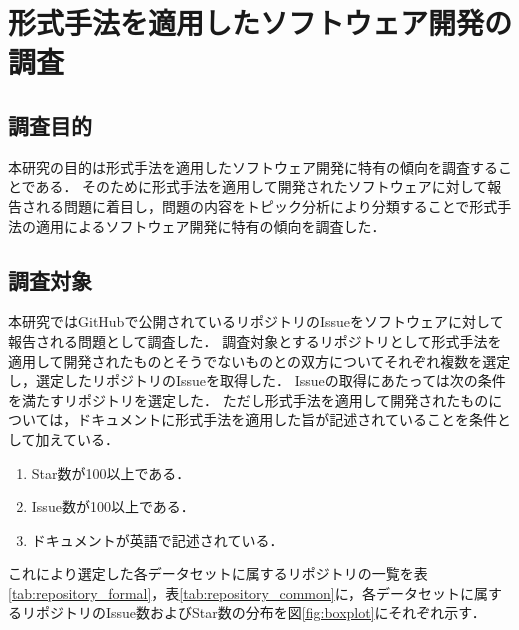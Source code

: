 \documentclass[main]{subfiles}
\begin{document}
\chapter{形式手法を適用したソフトウェア開発の調査}

\section{調査目的}

本研究の目的は形式手法を適用したソフトウェア開発に特有の傾向を調査することである．
そのために形式手法を適用して開発されたソフトウェアに対して報告される問題に着目し，問題の内容をトピック分析により分類することで形式手法の適用によるソフトウェア開発に特有の傾向を調査した．

\section{調査対象}
\label{sec:survey-target}

本研究ではGitHubで公開されているリポジトリのIssueをソフトウェアに対して報告される問題として調査した．
調査対象とするリポジトリとして形式手法を適用して開発されたものとそうでないものとの双方についてそれぞれ複数を選定し，選定したリポジトリのIssueを取得した．
Issueの取得にあたっては次の条件を満たすリポジトリを選定した．
ただし形式手法を適用して開発されたものについては，ドキュメントに形式手法を適用した旨が記述されていることを条件として加えている．

\begin{enumerate}
	\item Star数が100以上である．
	\item Issue数が100以上である．
	\item ドキュメントが英語で記述されている．
\end{enumerate}

これにより選定した各データセットに属するリポジトリの一覧を表\ref{tab:repository_formal}，表\ref{tab:repository_common}に，各データセットに属するリポジトリのIssue数およびStar数の分布を図\ref{fig:boxplot}にそれぞれ示す．


\end{document}
